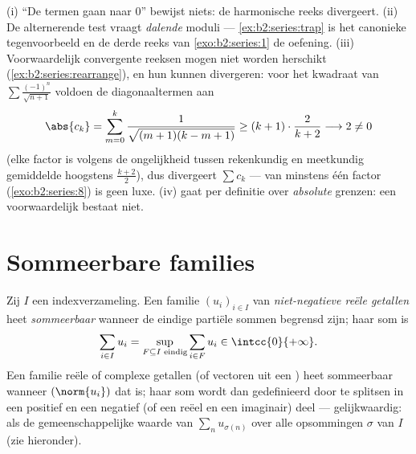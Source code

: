 \begin{remark}\label{rem:b2:series:pitfalls}
(i) ``De termen gaan naar $0$'' bewijst niets: de harmonische reeks
divergeert. (ii) De alternerende test vraagt \emph{dalende} moduli
--- \cref{ex:b2:series:trap} is het canonieke tegenvoorbeeld en de
derde reeks van \cref{exo:b2:series:1} de oefening. (iii)
Voorwaardelijk convergente reeksen mogen niet worden herschikt
(\cref{ex:b2:series:rearrange}), en hun  kunnen
divergeren: voor het kwadraat van $\sum\frac{(-1)^n}{\sqrt{n+1}}$
voldoen de diagonaaltermen aan
\[
\abs{c_k} = \sum_{m=0}^{k}
\frac{1}{\sqrt{(m+1)(k-m+1)}}
\geq (k+1)\cdot\frac{2}{k+2} \longrightarrow 2 \neq 0
\]
(elke factor is volgens de ongelijkheid tussen rekenkundig en
meetkundig gemiddelde hoogstens $\frac{k+2}2$), dus divergeert
$\sum c_k$ ---  van minstens één factor
(\cref{exo:b2:series:8}) is geen luxe. (iv)  gaat
per definitie over \emph{absolute} grenzen: een voorwaardelijk
 bestaat niet.
\end{remark}

\section{Sommeerbare families}

\begin{definition}\label{def:b2:series:summable}
Zij $I$ een  indexverzameling. Een familie $(u_i)_{i \in
I}$ van \emph{niet-negatieve reële getallen} heet
\emph{sommeerbaar} wanneer de eindige
partiële sommen begrensd zijn; haar som is
\[
\sum_{i \in I} u_i = \sup_{F \subseteq I \text{ eindig}} \sum_{i
\in F} u_i \in \intcc{0}{+\infty} .
\]
Een familie reële of complexe getallen (of vectoren uit een
) heet sommeerbaar wanneer $(\norm{u_i})$ dat is; haar
som wordt dan gedefinieerd door te splitsen in een positief en een
negatief (of een reëel en een imaginair) deel --- gelijkwaardig:
als de gemeenschappelijke waarde van $\sum_{n} u_{\sigma(n)}$ over
alle opsommingen $\sigma$ van $I$ (zie hieronder).
\end{definition}

